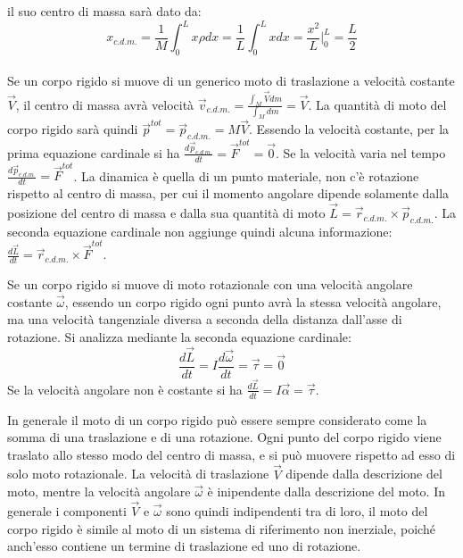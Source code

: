 \documentclass{article}
\numberwithin{equation}{subsection}
\begin{document}
il suo centro di massa sarà dato da:
\begin{equation*}
    x_{c.d.m.}=\displaystyle\frac{1}{M}\int_{0}^{L}x\rho dx=\frac{1}{L}\int_{0}^{L}xdx=\frac{x^2}{L}\Bigg|_0^L=\frac{L}{2} 
\end{equation*}
\\
Se un corpo rigido si muove di un generico moto di traslazione a velocità costante $\vec{V}$, 
il centro di massa avrà velocità $\vec{v}_{c.d.m.}=\displaystyle\frac{\int_M\vec{V}dm}{\int_M dm}=\vec{V}$. La quantità di moto del corpo rigido sarà quindi 
$\vec{p}^{tot}=\vec{p}_{c.d.m.}=M\vec{V}$. Essendo la velocità costante, per la prima equazione cardinale si ha $\displaystyle\frac{d\vec{p}_{c.d.m.}}{dt}=\vec{F}^{tot}=\vec0$. 
Se la velocità varia nel tempo $\displaystyle\frac{d\vec{p}_{c.d.m.}}{dt}=\vec{F}^{tot}$. 
La dinamica è quella di un punto materiale, non c'è rotazione rispetto al centro di massa, per cui il 
momento angolare dipende solamente dalla posizione del centro di massa e dalla sua quantità di moto $\vec L=\vec{r}_{c.d.m.}\times\vec{p}_{c.d.m.}$. La seconda 
equazione cardinale non aggiunge quindi alcuna informazione: $\displaystyle\frac{d\vec{L}}{dt}=\vec{r}_{c.d.m.}\times\vec{F}^{tot}$. 



Se un corpo rigido si muove di moto rotazionale con una velocità 
angolare costante $\vec{\omega}$, essendo un corpo rigido ogni punto avrà la stessa velocità angolare, ma una velocità tangenziale diversa a seconda della distanza 
dall'asse di rotazione. Si analizza mediante la seconda equazione cardinale:
\begin{equation}
    \displaystyle\frac{d\vec{L}}{dt}=I\frac{d\vec\omega}{dt}=\vec{\tau}=\vec0
\end{equation}
Se la velocità angolare non è costante si ha $\displaystyle\frac{d\vec{L}}{dt}=I\vec{\alpha}=\vec{\tau}$. 



In generale il moto di un corpo rigido può essere sempre considerato come la somma di una traslazione e di una rotazione. Ogni punto del corpo rigido viene traslato 
allo stesso modo del centro di massa, e si può muovere rispetto ad esso di solo moto rotazionale. La velocità di traslazione $\vec{V}$ dipende dalla descrizione del moto, 
mentre la velocità angolare $\vec{\omega}$ è inipendente dalla descrizione del moto. In generale i componenti $\vec{V}$ e $\vec{\omega}$ sono quindi indipendenti tra di loro, 
il moto del corpo rigido è simile al moto di un sistema di riferimento non inerziale, poiché anch'esso contiene un termine di traslazione ed uno di rotazione. 
\end{document}
